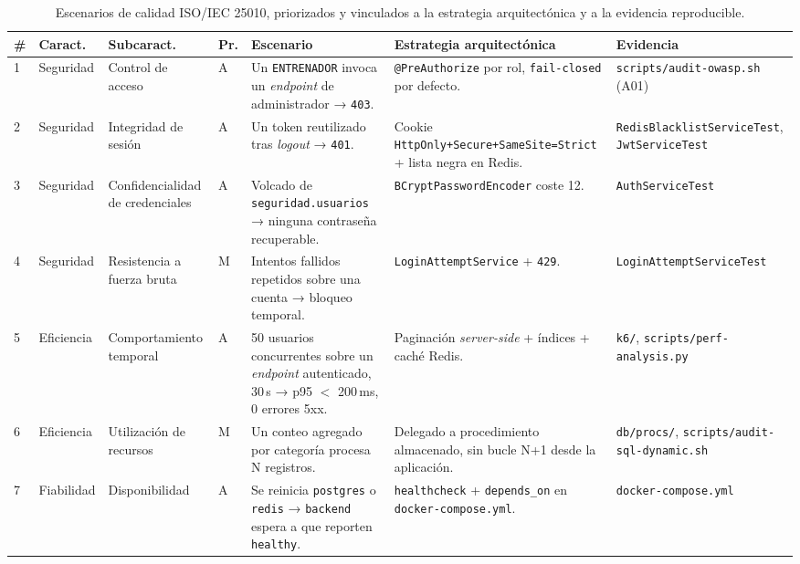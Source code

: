 \documentclass[11pt,a4paper]{article}
\newcommand{\ruta}[1]{\texttt{\footnotesize #1}}
\begin{document}
\begin{table}[htbp]
\centering
\scriptsize
\setlength{\tabcolsep}{3pt}
\caption{Escenarios de calidad ISO/IEC 25010, priorizados y vinculados a la estrategia arquitectónica y a la evidencia reproducible.}
\label{tab:iso25010}
\begin{tabular}{@{}p{0.35cm}p{1.9cm}p{2.3cm}p{0.35cm}p{3.6cm}p{3.4cm}p{2.35cm}@{}}
\toprule
\textbf{\#} & \textbf{Caract.} & \textbf{Subcaract.} & \textbf{Pr.} & \textbf{Escenario} & \textbf{Estrategia arquitectónica} & \textbf{Evidencia} \\
\midrule
1 & Seguridad & Control de acceso & A & Un \texttt{ENTRENADOR} invoca un \emph{endpoint} de administrador → \texttt{403}. & \texttt{@PreAuthorize} por rol, \texttt{fail-closed} por defecto. & \ruta{scripts/\allowbreak audit-owasp.sh} (A01) \\
2 & Seguridad & Integridad de sesión & A & Un token reutilizado tras \emph{logout} → \texttt{401}. & Cookie \texttt{HttpOnly+\allowbreak Secure+\allowbreak SameSite=\allowbreak Strict} + lista negra en Redis. & \texttt{Redis\allowbreak Blacklist\allowbreak ServiceTest}, \texttt{Jwt\allowbreak ServiceTest} \\
3 & Seguridad & Confidencialidad de credenciales & A & Volcado de \texttt{seguridad.\allowbreak usuarios} → ninguna contraseña recuperable. & \texttt{BCryptPasswordEncoder} coste 12. & \texttt{Auth\allowbreak ServiceTest} \\
4 & Seguridad & Resistencia a fuerza bruta & M & Intentos fallidos repetidos sobre una cuenta → bloqueo temporal. & \texttt{LoginAttemptService} + \texttt{429}. & \texttt{Login\allowbreak Attempt\allowbreak ServiceTest} \\
5 & Eficiencia & Comportamiento temporal & A & 50 usuarios concurrentes sobre un \emph{endpoint} autenticado, 30\,s → p95 $<$ 200\,ms, 0 errores 5xx. & Paginación \emph{server-side} + índices + caché Redis. & \texttt{k6/}, \texttt{scripts/\allowbreak perf-analysis.py} \\
6 & Eficiencia & Utilización de recursos & M & Un conteo agregado por categoría procesa N registros. & Delegado a procedimiento almacenado, sin bucle N+1 desde la aplicación. & \texttt{db/\allowbreak procs/}, \texttt{scripts/\allowbreak audit-\allowbreak sql-\allowbreak dynamic.sh} \\
7 & Fiabilidad & Disponibilidad & A & Se reinicia \texttt{postgres} o \texttt{redis} → \texttt{backend} espera a que reporten \texttt{healthy}. & \texttt{healthcheck} + \texttt{depends\_on} en \texttt{docker-compose.yml}. & \texttt{docker-\allowbreak compose.yml} \\

\end{tabular}
\end{table}
\end{document}
